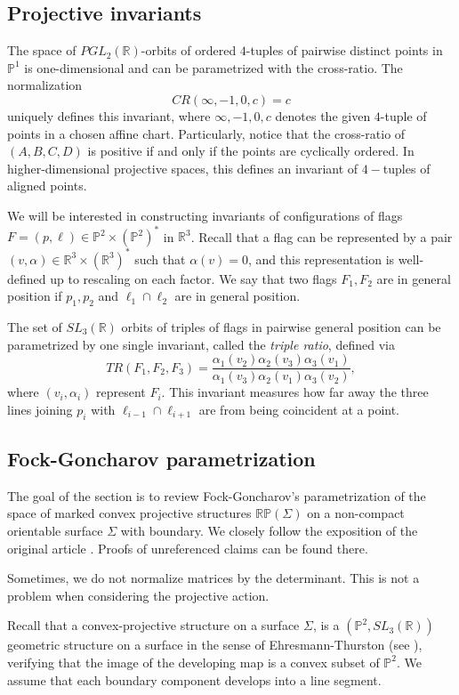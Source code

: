 \documentclass{amsart}
\newcommand{\RR}{\mathbb{R}}
\theoremstyle{remark}
\theoremstyle{definition}
\begin{document}
\subsection{Projective invariants}
The space of $PGL_2(\mathbb{R})$-orbits of ordered $4$-tuples of pairwise distinct points in $\mathbb{P}^1$ is one-dimensional and can be parametrized with the cross-ratio. 
The normalization 
$$CR(\infty,-1,0,c)=c$$
uniquely defines this invariant, where $\infty, -1,0,c$ denotes the given $4$-tuple of points in a chosen affine chart.
Particularly, notice that the cross-ratio of $(A, B, C, D)$ is positive if and only if the points are cyclically ordered.
In higher-dimensional projective spaces, this defines an invariant of $4-$tuples of aligned points.

We will be interested in constructing invariants of configurations of flags $F = (p,\ell) \in \mathbb{P}^2 \times (\mathbb{P}^2)^*$ in $\mathbb{R}^3$.
Recall that a flag can be represented by a pair $(v,\alpha) \in \mathbb{R}^3 \times (\mathbb{R}^3)^*$ such that $\alpha (v) = 0$, and this representation is well-defined up to rescaling on each factor.
We say that two flags $F_1, F_2$ are in general position if $p_1,p_2$ and $\ell_1 \cap \ell_2$ are in general position.

The set of $SL_3(\RR)$ orbits of triples of flags in pairwise general position can be parametrized by one single invariant, called the \emph{triple ratio}, defined via
$$TR (F_1,F_2,F_3) = \frac{\alpha_1 (v_2)\alpha_2 (v_3)\alpha_3 (v_1)}{\alpha_1 (v_3)\alpha_2 (v_1)\alpha_3 (v_2)},$$
where $(v_i,\alpha_i)$ represent $F_i$.
This invariant measures how far away the three lines joining $p_i$ with $\ell_{i-1} \cap \ell_{i+1}$ are from being coincident at a point.

\subsection{Fock-Goncharov parametrization}

The goal of the section is to review Fock-Goncharov's parametrization of the space of marked convex projective structures $\mathbb{RP} (\Sigma)$ on a non-compact orientable surface $\Sigma$ with boundary.
We closely follow the exposition of the original article \cite{fock2007moduli}. Proofs of unreferenced claims can be found there.

Sometimes, we do not normalize matrices by the determinant. This is not a problem when considering the projective action.

Recall that a convex-projective structure on a surface $\Sigma$, is a $(\mathbb{P}^2, SL_3 (\mathbb{R}))$ geometric structure on a surface in the sense of Ehresmann-Thurston (see \cite[Chapter 3]{thurston2022geometry}), verifying that the image of the developing map is a convex subset of $\mathbb{P}^2$.
We assume that each boundary component develops into a line segment.
\end{document}

